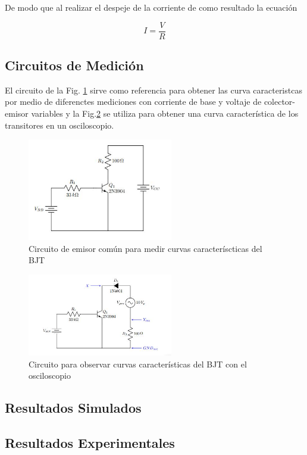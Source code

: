 \documentclass[journal]{IEEEtran}
\begin{document}
De modo que al realizar el despeje de la corriente de como resultado la ecuación

\begin{equation}
I=\frac{V}{R}
\end{equation}

\subsection{Circuitos de Medición}

El circuito de la Fig. \ref{fig:T1} sirve como referencia para obtener las curva caracteristcas por medio de diferenctes mediciones con corriente de base y voltaje de colector-emisor variables y la Fig.\ref{fig:T2} se utiliza para obtener una curva característica de los transitores en un osciloscopio.

 
\begin{figure}[H]
	\centering
	\includegraphics[width=2.5in]{circuito_T1}
	\caption{Circuito de emisor común para medir curvas caracteríscticas del BJT}
	\label{fig:T1}	
\end{figure}
\hfill

\begin{figure}[H]
	\centering
	\includegraphics[width=2.5in]{circuito_T2}
	\caption{Circuito para observar curvas características del BJT con el osciloscopio}
	\label{fig:T2}	
\end{figure}
\hfill

\subsection{Resultados Simulados}

\subsection{Resultados Experimentales}
\end{document}

